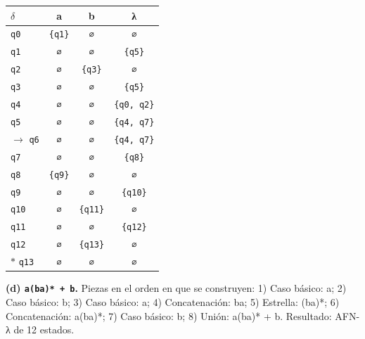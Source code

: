 \documentclass[11pt]{article}
\begin{document}
\begin{center}\small\begin{tabular}{lccc}\toprule
$\delta$ & a & b & λ \\\midrule
 \texttt{q0} & \texttt{\{q1\}} & \texttt{∅} & \texttt{∅} \\
 \texttt{q1} & \texttt{∅} & \texttt{∅} & \texttt{\{q5\}} \\
 \texttt{q2} & \texttt{∅} & \texttt{\{q3\}} & \texttt{∅} \\
 \texttt{q3} & \texttt{∅} & \texttt{∅} & \texttt{\{q5\}} \\
 \texttt{q4} & \texttt{∅} & \texttt{∅} & \texttt{\{q0, q2\}} \\
 \texttt{q5} & \texttt{∅} & \texttt{∅} & \texttt{\{q4, q7\}} \\
$\to$ \texttt{q6} & \texttt{∅} & \texttt{∅} & \texttt{\{q4, q7\}} \\
 \texttt{q7} & \texttt{∅} & \texttt{∅} & \texttt{\{q8\}} \\
 \texttt{q8} & \texttt{\{q9\}} & \texttt{∅} & \texttt{∅} \\
 \texttt{q9} & \texttt{∅} & \texttt{∅} & \texttt{\{q10\}} \\
 \texttt{q10} & \texttt{∅} & \texttt{\{q11\}} & \texttt{∅} \\
 \texttt{q11} & \texttt{∅} & \texttt{∅} & \texttt{\{q12\}} \\
 \texttt{q12} & \texttt{∅} & \texttt{\{q13\}} & \texttt{∅} \\
$*$ \texttt{q13} & \texttt{∅} & \texttt{∅} & \texttt{∅} \\
\bottomrule\end{tabular}\end{center}
\textbf{(d) \texttt{a(ba)* + b}.} Piezas en el orden en que se construyen: 1) Caso básico: a; 2) Caso básico: b; 3) Caso básico: a; 4) Concatenación: ba; 5) Estrella: (ba)*; 6) Concatenación: a(ba)*; 7) Caso básico: b; 8) Unión: a(ba)* + b. Resultado: AFN-λ de 12 estados.
\end{document}
